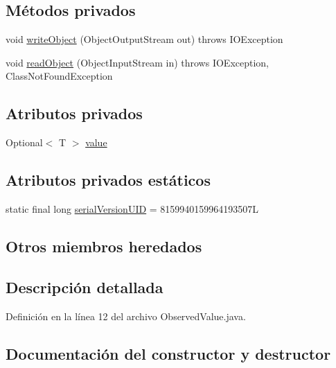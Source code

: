 \subsection*{Métodos privados}
\begin{DoxyCompactItemize}
\item 
void \mbox{\hyperlink{classcom_1_1ruralhousejsf_1_1domain_1_1observer_1_1_observed_value_aeb8db23c0310aa0fd0d9bcb2da10fa74}{write\+Object}} (Object\+Output\+Stream out)  throws I\+O\+Exception 
\item 
void \mbox{\hyperlink{classcom_1_1ruralhousejsf_1_1domain_1_1observer_1_1_observed_value_a51ae17b2577c4ffc87ccf4abca82ab3d}{read\+Object}} (Object\+Input\+Stream in)  throws I\+O\+Exception, Class\+Not\+Found\+Exception 
\end{DoxyCompactItemize}
\subsection*{Atributos privados}
\begin{DoxyCompactItemize}
\item 
Optional$<$ T $>$ \mbox{\hyperlink{classcom_1_1ruralhousejsf_1_1domain_1_1observer_1_1_observed_value_a7f337dfd21158b7642243b5fd1fcb877}{value}}
\end{DoxyCompactItemize}
\subsection*{Atributos privados estáticos}
\begin{DoxyCompactItemize}
\item 
static final long \mbox{\hyperlink{classcom_1_1ruralhousejsf_1_1domain_1_1observer_1_1_observed_value_a01052aac89cda6c5f230343d40b54e89}{serial\+Version\+U\+ID}} = 8159940159964193507L
\end{DoxyCompactItemize}
\subsection*{Otros miembros heredados}


\subsection{Descripción detallada}


Definición en la línea 12 del archivo Observed\+Value.\+java.



\subsection{Documentación del constructor y destructor}
\mbox{\label{classcom_1_1ruralhousejsf_1_1domain_1_1observer_1_1_observed_value_a3e9d0c3cf901dfdc6c5d919021d9b8ed}} 
